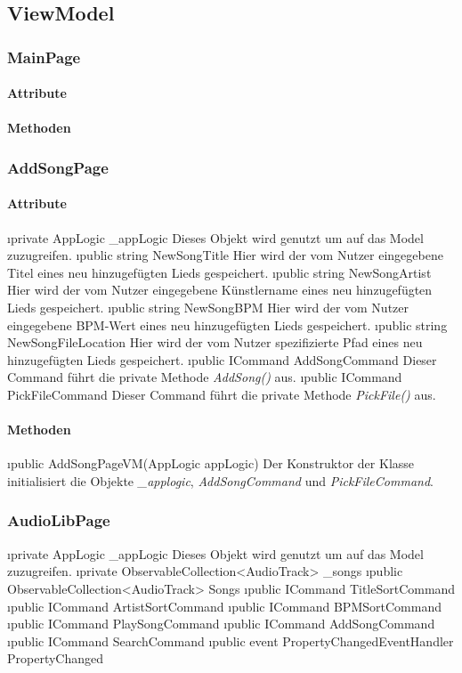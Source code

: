 \documentclass[../entwurf.tex]{subfiles}
\begin{document}
\subsection{ViewModel}
\subsubsection{MainPage}
\paragraph{Attribute}
\paragraph{Methoden}
\subsubsection{AddSongPage}
\paragraph{Attribute}
\begin{itemize}
	\i{private AppLogic \_appLogic} Dieses Objekt wird genutzt um auf das Model zuzugreifen.
	\i{public string NewSongTitle} Hier wird der vom Nutzer eingegebene Titel eines neu hinzugefügten Lieds gespeichert.
	\i{public string NewSongArtist} Hier wird der vom Nutzer eingegebene Künstlername eines neu hinzugefügten Lieds gespeichert.
	\i{public string NewSongBPM} Hier wird der vom Nutzer eingegebene BPM-Wert eines neu hinzugefügten Lieds gespeichert.
	\i{public string NewSongFileLocation} Hier wird der vom Nutzer spezifizierte Pfad eines neu hinzugefügten Lieds gespeichert.
	\i{public ICommand AddSongCommand} Dieser Command führt die private Methode \textit{AddSong()} aus.
	\i{public ICommand PickFileCommand} Dieser Command führt die private Methode \textit{PickFile()} aus.
\end{itemize}
\paragraph{Methoden}
\begin{itemize}
	\i{public AddSongPageVM(AppLogic appLogic)} Der Konstruktor der Klasse initialisiert die Objekte \textit{\_applogic}, \textit{AddSongCommand} und \textit{PickFileCommand}.
\end{itemize}
\subsubsection{AudioLibPage}
\begin{itemize}
	\i{private AppLogic \_appLogic} Dieses Objekt wird genutzt um auf das Model zuzugreifen.
	\i{private ObservableCollection<AudioTrack> \_songs}
	\i{public ObservableCollection<AudioTrack> Songs}
	\i{public ICommand TitleSortCommand}
	\i{public ICommand ArtistSortCommand}
	\i{public ICommand BPMSortCommand}
	\i{public ICommand PlaySongCommand}
	\i{public ICommand AddSongCommand}
	\i{public ICommand SearchCommand}
	\i{public event PropertyChangedEventHandler PropertyChanged}
\end{itemize}
\end{document}
